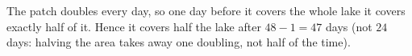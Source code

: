 The patch doubles every day, so one day before it covers the whole lake it covers exactly half of it. Hence it covers half the lake after $48-1=\boxed{47}$ days (not $24$ days: halving the area takes away one doubling, not half of the time).
